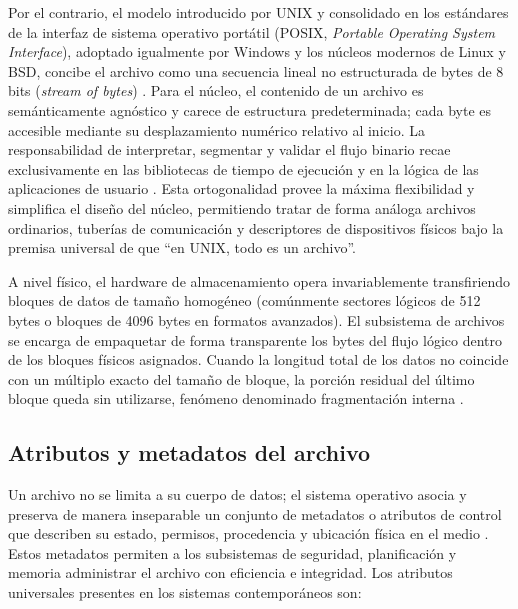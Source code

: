 \documentclass[12pt]{article}
\begin{document}
Por el contrario, el modelo introducido por UNIX y consolidado en los estándares de la interfaz de sistema operativo portátil (POSIX, \textit{Portable Operating System Interface}), adoptado igualmente por Windows y los núcleos modernos de Linux y BSD, concibe el archivo como una secuencia lineal no estructurada de bytes de 8 bits (\textit{stream of bytes}) \parencite[\S 8.2.1, pp.\ 421--422]{carretero2001sistemas}. Para el núcleo, el contenido de un archivo es semánticamente agnóstico y carece de estructura predeterminada; cada byte es accesible mediante su desplazamiento numérico relativo al inicio. La responsabilidad de interpretar, segmentar y validar el flujo binario recae exclusivamente en las bibliotecas de tiempo de ejecución y en la lógica de las aplicaciones de usuario \parencite[\S 10.1, p.\ 341]{silberschatz2006fundamentos}. Esta ortogonalidad provee la máxima flexibilidad y simplifica el diseño del núcleo, permitiendo tratar de forma análoga archivos ordinarios, tuberías de comunicación y descriptores de dispositivos físicos bajo la premisa universal de que \enquote{en UNIX, todo es un archivo}.

A nivel físico, el hardware de almacenamiento opera invariablemente transfiriendo bloques de datos de tamaño homogéneo (comúnmente sectores lógicos de 512 bytes o bloques de 4096 bytes en formatos avanzados). El subsistema de archivos se encarga de empaquetar de forma transparente los bytes del flujo lógico dentro de los bloques físicos asignados. Cuando la longitud total de los datos no coincide con un múltiplo exacto del tamaño de bloque, la porción residual del último bloque queda sin utilizarse, fenómeno denominado fragmentación interna \parencite[\S 10.1.5, p.\ 342]{silberschatz2006fundamentos}.

\subsection{Atributos y metadatos del archivo}
\label{subsec:atributosMetadatosArchivo}

Un archivo no se limita a su cuerpo de datos; el sistema operativo asocia y preserva de manera inseparable un conjunto de metadatos o atributos de control que describen su estado, permisos, procedencia y ubicación física en el medio \parencite[\S 12.1, p.\ 552]{stallings2018operating}. Estos metadatos permiten a los subsistemas de seguridad, planificación y memoria administrar el archivo con eficiencia e integridad. Los atributos universales presentes en los sistemas contemporáneos son:
\end{document}
